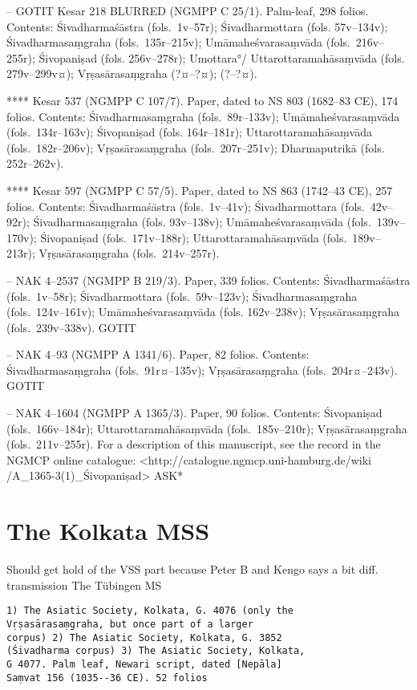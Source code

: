 \documentclass[]{article}
\begin{document}
-- GOTIT Kesar 218 BLURRED (NGMPP C 25/1). Palm-leaf, 298 folios.
Contents: Śivadharmaśāstra (fols.~1v--57r); Śivadharmottara (fols.
57v--134v); Śivadharmasaṃgraha (fols.~135r--215v); Umāmaheśvarasaṃvāda
(fols.~216v--255r); Śivopaniṣad (fols. 256v--278r); Umottara°/
Uttarottaramahāsaṃvāda (fols. 279v--299v¤); Vṛṣasārasaṃgraha (?¤--?¤);
(?--?¤).

**** Kesar 537 (NGMPP C 107/7). Paper, dated to NS 803 (1682--83 CE),
174 folios. Contents: Śivadharmasaṃgraha (fols.~89r--133v);
Umāmaheśvarasaṃvāda (fols.~134r--163v); Śivopaniṣad (fols. 164r--181r);
Uttarottaramahāsaṃvāda (fols.~182r--206v); Vṛṣasārasaṃgraha
(fols.~207r--251v); Dharmaputrikā (fols. 252r--262v).

**** Kesar 597 (NGMPP C 57/5). Paper, dated to NS 863 (1742--43 CE), 257
folios. Contents: Śivadharmaśāstra (fols.~1v--41v); Śivadharmottara
(fols.~42v--92r); Śivadharmasaṃgraha (fols. 93v--138v);
Umāmaheśvarasaṃvāda (fols.~139v-- 170v); Śivopaniṣad (fols.~171v--188r);
Uttarottaramahāsaṃvāda (fols.~189v-- 213r); Vṛṣasārasaṃgraha
(fols.~214v--257r).

-- NAK 4--2537 (NGMPP B 219/3). Paper, 339 folios. Contents:
Śivadharmaśāstra (fols.~1v--58r); Śivadharmottara (fols.~59v--123v);
Śivadharmasaṃgraha (fols.~124v--161v); Umāmaheśvarasaṃvāda (fols.
162v--238v); Vṛṣasārasaṃgraha (fols.~239v--338v). GOTIT

-- NAK 4--93 (NGMPP A 1341/6). Paper, 82 folios. Contents:
Śivadharmasaṃgraha (fols.~91r¤--135v); Vṛṣasārasaṃgraha
(fols.~204r¤--243v). GOTIT

-- NAK 4--1604 (NGMPP A 1365/3). Paper, 90 folios. Contents: Śivopaniṣad
(fols.~166v--184r); Uttarottaramahāsaṃvāda (fols.~185v--210r);
Vṛṣasārasaṃgraha (fols.~211v--255r). For a description of this
manuscript, see the record in the NGMCP online catalogue:
\textless{}http://catalogue.ngmcp.uni-hamburg.de/wiki
/A\_1365-3(1)\_Śivopaniṣad\textgreater{} ASK*

\hypertarget{the-kolkata-mss}{%
\section{The Kolkata MSS}\label{the-kolkata-mss}}

Should get hold of the VSS part because Peter B and Kengo says a bit
diff. transmission The Tübingen MS

\begin{verbatim}
1) The Asiatic Society, Kolkata, G. 4076 (only the
Vṛṣasārasaṃgraha, but once part of a larger
corpus) 2) The Asiatic Society, Kolkata, G. 3852
(Śivadharma corpus) 3) The Asiatic Society, Kolkata,
G 4077. Palm leaf, Newari script, dated [Nepāla]
Saṃvat 156 (1035--36 CE). 52 folios
\end{verbatim}
\end{document}
